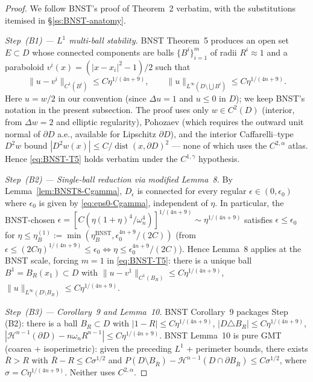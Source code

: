 \documentclass[11pt]{amsart}
\DeclareMathOperator{\dist}{dist}
\begin{document}
\begin{proof}
We follow BNST's proof of Theorem~2 verbatim, with the substitutions
itemised in \S\ref{ss:BNST-anatomy}.

\emph{Step~(B1) — $L^1$ multi-ball stability.}
BNST Theorem~5 produces an open set $E\subset D$ whose connected
components are balls $\{B^i\}_{i=1}^m$ of radii $R^i\approx 1$ and a
paraboloid $v^i(x)=(|x-x_i|^2-1)/2$ such that
\begin{equation}\label{eq:BNST-T5}
   \|u-v^i\|_{C^1(B^i)}\le C\eta^{1/(4n+9)},\qquad
   \|u\|_{L^\infty(D\setminus\bigcup B^i)}\le C\eta^{1/(4n+9)}.
\end{equation}
Here $u=w/2$ in our convention (since $\Delta u=1$ and $u\le 0$ in
$D$); we keep BNST's notation in the present subsection.  The proof
uses only $w\in C^2(D)$ (interior, from $\Delta w=2$ and
elliptic regularity), Pohozaev (which requires the outward unit
normal of $\partial D$ a.e., available for Lipschitz $\partial D$),
and the interior Caffarelli–type $D^2 w$ bound
$|D^2 w(x)|\le C/\dist(x,\partial D)^2$ — none of which uses the
$C^{2,\alpha}$ atlas.  Hence \eqref{eq:BNST-T5} holds verbatim under
the $C^{1,\gamma}$ hypothesis.

\emph{Step~(B2) — Single-ball reduction via modified Lemma~8.}
By Lemma~\ref{lem:BNST8-Cgamma}, $D_\epsilon$ is connected for every
regular $\epsilon\in(0,\epsilon_0)$ where $\epsilon_0$ is given by
\eqref{eq:eps0-Cgamma}, independent of $\eta$.  In particular, the
BNST-chosen $\epsilon=[C(\eta(1+\eta)^4/\omega_n^4)]^{1/(4n+9)}\sim
\eta^{1/(4n+9)}$ satisfies $\epsilon\le\epsilon_0$ for $\eta\le
\eta_B^{(1)}:=\min(\eta_B^{\text{BNST}},\epsilon_0^{4n+9}/(2C))$
\textup{(}from $\epsilon\le(2C\eta)^{1/(4n+9)}\le\epsilon_0\iff
\eta\le\epsilon_0^{4n+9}/(2C)$\textup{)}.
Hence Lemma~8 applies at the BNST scale, forcing $m=1$ in
\eqref{eq:BNST-T5}: there is a unique ball $B^1=B_R(x_1)\subset D$
with $\|u-v^1\|_{C^1(B_R)}\le C\eta^{1/(4n+9)}$,
$\|u\|_{L^\infty(D\setminus B_R)}\le C\eta^{1/(4n+9)}$.

\emph{Step~(B3) — Corollary~9 and Lemma~10.}
BNST Corollary~9 packages Step (B2): there is a ball $B_R\subset D$
with $|1-R|\le C\eta^{1/(4n+9)}$, $|D\triangle B_R|\le C\eta^{1/(4n+9)}$,
$|\mathcal H^{n-1}(\partial D)-n\omega_n R^{n-1}|\le C\eta^{1/(4n+9)}$.
BNST Lemma~10 is pure GMT (coarea + isoperimetric): given the
preceding $L^1$ + perimeter bounds, there exists $\bar R>R$ with
$\bar R-R\le C\sigma^{1/2}$ and $P(D\setminus B_{\bar R})-
\mathcal H^{n-1}(D\cap\partial B_{\bar R})\le C\sigma^{1/2}$, where
$\sigma=C\eta^{1/(4n+9)}$.  Neither uses $C^{2,\alpha}$.


\end{proof}
\end{document}
